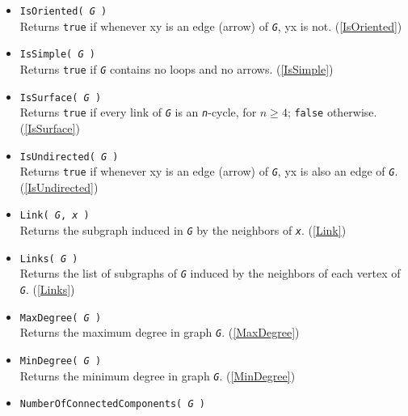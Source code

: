 \documentclass[a4paper,11pt]{report}
\begin{document}
{{\begin{itemize}
 Returns \texttt{true} when \mbox{\texttt{\mdseries\slshape G}} is isomorphic to \mbox{\texttt{\mdseries\slshape H}} and \texttt{false} otherwise. (\ref{IsLoopless}) 
\item \texttt{IsOriented( \mbox{\texttt{\mdseries\slshape G}} )}\\
 Returns \texttt{true} if whenever xy is an edge (arrow) of \mbox{\texttt{\mdseries\slshape G}}, yx is not. (\ref{IsOriented}) 
\item \texttt{IsSimple( \mbox{\texttt{\mdseries\slshape G}} )}\\
 Returns \texttt{true} if \mbox{\texttt{\mdseries\slshape G}} contains no loops and no arrows. (\ref{IsSimple}) 
\item \texttt{IsSurface( \mbox{\texttt{\mdseries\slshape G}} )}\\
 Returns \texttt{true} if every link of \mbox{\texttt{\mdseries\slshape G}} is an \mbox{\texttt{\mdseries\slshape n}}-cycle, for $n\geq 4$; \texttt{false} otherwise. (\ref{IsSurface}) 
\item \texttt{IsUndirected( \mbox{\texttt{\mdseries\slshape G}} )}\\
 Returns \texttt{true} if whenever xy is an edge (arrow) of \mbox{\texttt{\mdseries\slshape G}}, yx is also an edge of \mbox{\texttt{\mdseries\slshape G}}. (\ref{IsUndirected}) 
\item \texttt{Link( \mbox{\texttt{\mdseries\slshape G}}, \mbox{\texttt{\mdseries\slshape x}} )}\\
 Returns the subgraph induced in \mbox{\texttt{\mdseries\slshape G}} by the neighbors of \mbox{\texttt{\mdseries\slshape x}}. (\ref{Link}) 
\item \texttt{Links( \mbox{\texttt{\mdseries\slshape G}} )}\\
 Returns the list of subgraphs of \mbox{\texttt{\mdseries\slshape G}} induced by the neighbors of each vertex of \mbox{\texttt{\mdseries\slshape G}}. (\ref{Links}) 
\item \texttt{MaxDegree( \mbox{\texttt{\mdseries\slshape G}} )}\\
 Returns the maximum degree in graph \mbox{\texttt{\mdseries\slshape G}}. (\ref{MaxDegree}) 
\item \texttt{MinDegree( \mbox{\texttt{\mdseries\slshape G}} )}\\
 Returns the minimum degree in graph \mbox{\texttt{\mdseries\slshape G}}. (\ref{MinDegree}) 
\item \texttt{NumberOfConnectedComponents( \mbox{\texttt{\mdseries\slshape G}} )}\\

\end{itemize}}}
\end{document}
